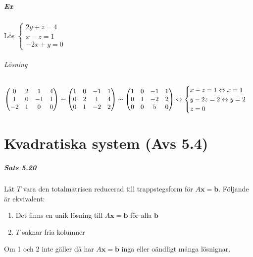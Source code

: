 \paragraph{Ex} Lös $\begin{cases}
    2y+z=4\\
    x-z=1\\
    -2x+y=0
\end{cases}$
\subparagraph{Lösning}
\begin{equation*}
    \begin{pmatrix}
        0&2&1&4\\
        1&0&-1&1\\
        -2&1&0&0
    \end{pmatrix}
    \thicksim
    \begin{pmatrix}
        1&0&-1&1\\
        0&2&1&4\\
        0&1&-2&2
    \end{pmatrix}
    \thicksim
    \begin{pmatrix}
        1&0&-1&1\\
        0&1&-2&2\\
        0&0&5&0
    \end{pmatrix}
    \Leftrightarrow
    \begin{cases}
        x-z=1\Leftrightarrow x=1\\
        y-2z=2\leftrightarrow y=2\\
        z=0
    \end{cases}
\end{equation*}

\chapter{Kvadratiska system (Avs 5.4)}
\paragraph{Sats 5.20} Låt $T$ vara den totalmatrisen reducerad till trappstegsform för $A\bm{x}=\bm{b}$.
Följande är ekvivalent:
\begin{enumerate}
    \item Det finns en unik lösning till $A\bm{x}=\bm{b}$ för alla $\bm{b}$
    \item $T$ saknar fria kolumner
\end{enumerate}
Om 1 och 2 inte gäller då har $A\bm{x}=\bm{b}$ inga eller oändligt många lösnignar.

